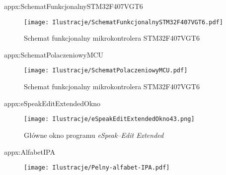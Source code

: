 	\begin{zalacznik}{appx:SchematFunkcjonalnySTM32F407VGT6}{\visiblefalse}
	
		\begin{figure}[ht!]
			\centering
			\texttt{[image: Ilustracje/SchematFunkcjonalnySTM32F407VGT6.pdf]}
			\caption[Schemat funkcjonalny mikrokontrolera STM32F407VGT6]{Schemat funkcjonalny mikrokontrolera STM32F407VGT6}
			\label{fig:SchematFunkcjonalnySTM32F407VGT6}
		\end{figure}
		
	\end{zalacznik}
	
	\begin{zalacznik}{appx:SchematPolaczeniowyMCU}{\visibletrue}
	
		\begin{figure}[ht!]
			\centering
			\texttt{[image: Ilustracje/SchematPolaczeniowyMCU.pdf]}
			\caption[Schemat funkcjonalny mikrokontrolera STM32F407VGT6]{Schemat funkcjonalny mikrokontrolera STM32F407VGT6}
			\label{fig:SchematPolaczeniowyMCU}
		\end{figure}
		
	\end{zalacznik}
	
	\begin{zalacznik}{appx:eSpeakEditExtendedOkno}{\visibletrue}
		\begin{figure}[ht!]
			\centering
			\texttt{[image: Ilustracje/eSpeakEditExtendedOkno43.png]}
			\caption{Główne okno programu \textit{eSpeak--Edit Extended}}
			\label{fig:eSpeakEditExtendedOkno}
		\end{figure}
	\end{zalacznik}
	
	\begin{zalacznik}{appx:AlfabetIPA}{\visiblefalse}

		\begin{figure}[ht]
		\begin{minipage}[t]{15cm}
			\centering
			\texttt{[image: Ilustracje/Pelny-alfabet-IPA.pdf]}
			\label{fig:Pelny-alfabet-IPA}
			\end{minipage}
		\end{figure}
	
	\end{zalacznik}
	
